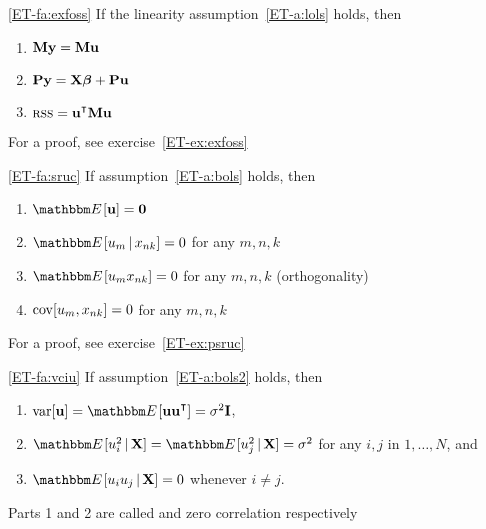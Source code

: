 \begin{frame}
    
    \vspace{2em}
    \Fact\eqref{ET-fa:exfoss}
        If the linearity assumption~\ref{ET-a:lols} holds, then
        \begin{enumerate}
            \item $\mathbf M {\mathbf y} = \mathbf M {\mathbf u}$
            \item $\mathbf P {\mathbf y} = \mathbf X {\boldsymbol \beta} + \mathbf P {\mathbf u}$
            \item $\rss = \boldu^\T \boldM \boldu$
        \end{enumerate}
        For a proof, see exercise~\ref{ET-ex:exfoss}
    
    \vspace{.7em}
    \Fact\eqref{ET-fa:sruc}
        If assumption~\ref{ET-a:bols} holds, then
        \begin{enumerate}
            \item $\EE [\boldu] = \boldzero$
            \item $\EE [ u_m \given x_{nk} ] = 0$ for any $m, n, k$
            \item $\EE [ u_m x_{nk} ] = 0$ for any $m, n, k$ (orthogonality)
            \item $\operatorname{cov} [ u_m , x_{nk} ] = 0$ for any $m, n, k$
        \end{enumerate}
    For a proof, see exercise~\ref{ET-ex:psruc}
    
\end{frame}

\begin{frame}
    
    \vspace{2em}
    \Fact\eqref{ET-fa:vciu}
        If assumption~\ref{ET-a:bols2} holds, then
        \begin{enumerate}
            \item $\var [\boldu] = \EE [ \boldu \boldu^\T ] = \sigma^2 \boldI$,
            \item $\EE [ u_i^2 \given \boldX ] = \EE [ u_j^2 \given \boldX ] =
                \sigma^2$ for any $i, j$ in $1,\ldots,N$, and 
            \item $\EE [ u_i u_j \given \boldX ] = 0$ whenever $i \not= j$.
        \end{enumerate}
    
    \vspace{.7em}
    Parts 1 and 2 are called  and zero correlation
    respectively
    
\end{frame}

